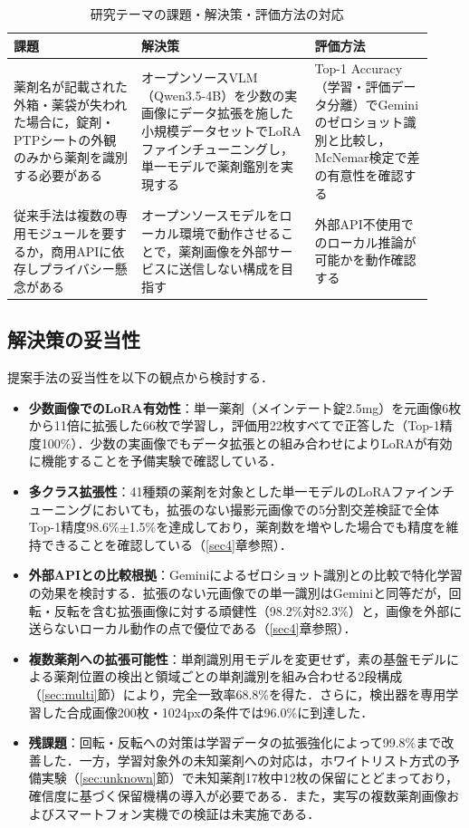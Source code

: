 \documentclass[dvipdfmx]{jsarticle}
\begin{document}
\begin{table}[h]
\centering
\caption{研究テーマの課題・解決策・評価方法の対応}
\label{tab:theme}
\small
\setlength{\tabcolsep}{4pt}
\begin{tabular}{p{0.28\linewidth}p{0.38\linewidth}p{0.26\linewidth}}
\hline
課題 & 解決策 & 評価方法 \\
\hline
薬剤名が記載された外箱・薬袋が失われた場合に，錠剤・PTPシートの外観のみから薬剤を識別する必要がある &
オープンソースVLM（Qwen3.5-4B）を少数の実画像にデータ拡張を施した小規模データセットでLoRAファインチューニングし，単一モデルで薬剤鑑別を実現する &
Top-1 Accuracy（学習・評価データ分離）でGeminiのゼロショット識別と比較し，McNemar検定で差の有意性を確認する \\
\hline
従来手法は複数の専用モジュールを要するか，商用APIに依存しプライバシー懸念がある &
オープンソースモデルをローカル環境で動作させることで，薬剤画像を外部サービスに送信しない構成を目指す &
外部API不使用でのローカル推論が可能かを動作確認する \\
\hline
\end{tabular}
\end{table}

\subsection{解決策の妥当性}

提案手法の妥当性を以下の観点から検討する．

\begin{itemize}
  \item \textbf{少数画像でのLoRA有効性}：単一薬剤（メインテート錠2.5mg）を元画像6枚から11倍に拡張した66枚で学習し，評価用22枚すべてで正答した（Top-1精度100\%）．少数の実画像でもデータ拡張との組み合わせによりLoRAが有効に機能することを予備実験で確認している．
  \item \textbf{多クラス拡張性}：41種類の薬剤を対象とした単一モデルのLoRAファインチューニングにおいても，拡張のない撮影元画像での5分割交差検証で全体Top-1精度98.6\%$\pm$1.5\%を達成しており，薬剤数を増やした場合でも精度を維持できることを確認している（\ref{sec4}章参照）．
  \item \textbf{外部APIとの比較根拠}：Geminiによるゼロショット識別との比較で特化学習の効果を検討する．拡張のない元画像での単一識別はGeminiと同等だが，回転・反転を含む拡張画像に対する頑健性（98.2\%対82.3\%）と，画像を外部に送らないローカル動作の点で優位である（\ref{sec4}章参照）．
  \item \textbf{複数薬剤への拡張可能性}：単剤識別用モデルを変更せず，素の基盤モデルによる薬剤位置の検出と領域ごとの単剤識別を組み合わせる2段構成（\ref{sec:multi}節）により，完全一致率68.8\%を得た．さらに，検出器を専用学習した合成画像200枚・1024pxの条件では96.0\%に到達した．
  \item \textbf{残課題}：回転・反転への対策は学習データの拡張強化によって99.8\%まで改善した．一方，学習対象外の未知薬剤への対応は，ホワイトリスト方式の予備実験（\ref{sec:unknown}節）で未知薬剤17枚中12枚の保留にとどまっており，確信度に基づく保留機構の導入が必要である．また，実写の複数薬剤画像およびスマートフォン実機での検証は未実施である．
\end{itemize}
\end{document}
